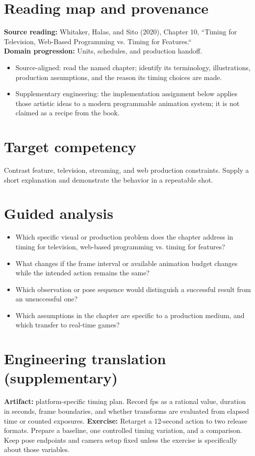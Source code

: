 \documentclass[10pt,letterpaper]{article}
\begin{document}
\makedoctitle
\makedocsummary

\section{Reading map and provenance}
\textbf{Source reading:} Whitaker, Halas, and Sito (2020), Chapter 10, ``Timing for Television, Web-Based Programming vs. Timing for Features.``\\
\textbf{Domain progression:} Units, schedules, and production handoff.
\begin{itemize}
\item Source-aligned: read the named chapter; identify its terminology, illustrations, production assumptions, and the reason its timing choices are made.
\item Supplementary engineering: the implementation assignment below applies those artistic ideas to a modern programmable animation system; it is not claimed as a recipe from the book.
\end{itemize}
\section{Target competency}
Contrast feature, television, streaming, and web production constraints. Supply a short explanation and demonstrate the behavior in a repeatable shot.
\section{Guided analysis}
\begin{itemize}
\item Which specific visual or production problem does the chapter address in timing for television, web-based programming vs. timing for features?
\item What changes if the frame interval or available animation budget changes while the intended action remains the same?
\item Which observation or pose sequence would distinguish a successful result from an unsuccessful one?
\item Which assumptions in the chapter are specific to a production medium, and which transfer to real-time games?
\end{itemize}
\section{Engineering translation (supplementary)}
\textbf{Artifact:} platform-specific timing plan. Record fps as a rational value, duration in seconds, frame boundaries, and whether transforms are evaluated from elapsed time or counted exposures.
\textbf{Exercise:} Retarget a 12-second action to two release formats. Prepare a baseline, one controlled timing variation, and a comparison. Keep pose endpoints and camera setup fixed unless the exercise is specifically about those variables.
\end{document}
